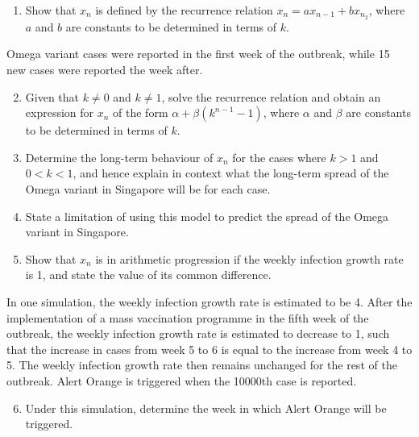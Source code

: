 \documentclass{echw}
\begin{document}
        \begin{enumerate}
            \item Show that $x_n$ is defined by the recurrence relation $x_n = ax_{n-1} + bx_{n_2}$, where $a$ and $b$ are constants to be determined in terms of $k$.
        \end{enumerate}

         Omega variant cases were reported in the first week of the outbreak, while 15 new cases were reported the week after.

        \begin{enumerate}
            \setcounter{enumi}{1}
            \item Given that $k \neq 0$ and $k \neq 1$, solve the recurrence relation and obtain an expression for $x_n$ of the form $\alpha + \beta\left(k^{n-1} - 1\right)$, where $\alpha$ and $\beta$ are constants to be determined in terms of $k$.
            \item Determine the long-term behaviour of $x_n$ for the cases where $k > 1$ and $0 < k < 1$, and hence explain in context what the long-term spread of the Omega variant in Singapore will be for each case.
            \item State a limitation of using this model to predict the spread of the Omega variant in Singapore.
            \item Show that $x_n$ is in arithmetic progression if the weekly infection growth rate is 1, and state the value of its common difference.
        \end{enumerate}

        \noindent In one simulation, the weekly infection growth rate is estimated to be 4. After the implementation of a mass vaccination programme in the fifth week of the outbreak, the weekly infection growth rate is estimated to decrease to 1, such that the increase in cases from week 5 to 6 is equal to the increase from week 4 to 5. The weekly infection growth rate then remains unchanged for the rest of the outbreak. Alert Orange is triggered when the 10000th case is reported.

        \begin{enumerate}
            \setcounter{enumi}{5}
            \item Under this simulation, determine the week in which Alert Orange will be triggered.
        \end{enumerate}

    \solution
\end{document}
